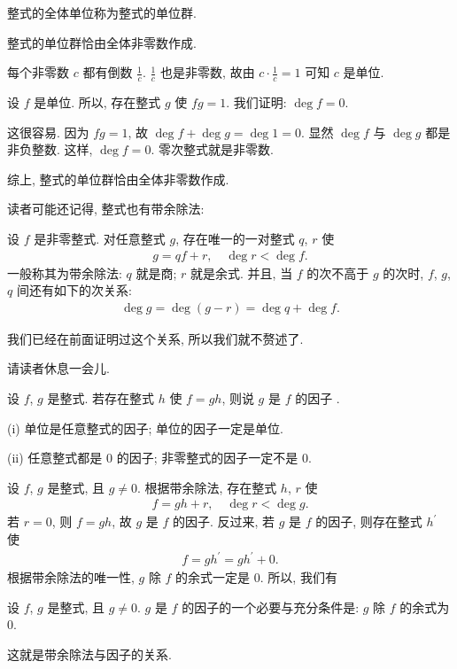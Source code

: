 \begin{definition}
    整式的全体单位称为整式的单位群.
\end{definition}

\begin{proposition}
    整式的单位群恰由全体非零数作成.
\end{proposition}

\begin{pf}
    每个非零数 $c$ 都有倒数 $\frac{1}{c}$. $\frac{1}{c}$ 也是非零数, 故由 $c \cdot \frac{1}{c} = 1$ 可知 $c$ 是单位.

    设 $f$ 是单位. 所以, 存在整式 $g$ 使 $fg = 1$. 我们证明: $\deg f = 0$.

    这很容易. 因为 $fg = 1$, 故 $\deg f + \deg g = \deg 1 = 0$. 显然 $\deg f$ 与 $\deg g$ 都是非负整数. 这样, $\deg f = 0$. 零次整式就是非零数.

    综上, 整式的单位群恰由全体非零数作成.
\end{pf}

读者可能还记得, 整式也有带余除法:

\begin{proposition}
    设 $f$ 是非零整式. 对任意整式 $g$, 存在唯一的一对整式 $q$, $r$ 使
    \begin{align*}
        g = q f + r, \quad \deg r < \deg f.
    \end{align*}
    一般称其为带余除法: $q$ 就是商; $r$ 就是余式. 并且, 当 $f$ 的次不高于 $g$ 的次时, $f$, $g$, $q$ 间还有如下的次关系:
    \begin{align*}
        \deg g = \deg (g - r) = \deg q + \deg f.
    \end{align*}
\end{proposition}

我们已经在前面证明过这个关系, 所以我们就不赘述了.

请读者休息一会儿.

\myLine

\begin{definition}
    设 $f$, $g$ 是整式. 若存在整式 $h$ 使 $f=gh$, 则说 $g$ 是 $f$ 的因子 .
\end{definition}

\begin{example}
    (i) 单位是任意整式的因子; 单位的因子一定是单位.

    (ii) 任意整式都是 $0$ 的因子; 非零整式的因子一定不是 $0$.
\end{example}

设 $f$, $g$ 是整式, 且 $g \neq 0$. 根据带余除法, 存在整式 $h$, $r$ 使
\begin{align*}
    f = gh + r, \quad \deg r < \deg g.
\end{align*}
若 $r = 0$, 则 $f = gh$, 故 $g$ 是 $f$ 的因子. 反过来, 若 $g$ 是 $f$ 的因子, 则存在整式 $h^{\prime}$ 使
\begin{align*}
    f = gh^{\prime} = gh^{\prime} + 0.
\end{align*}
根据带余除法的唯一性, $g$ 除 $f$ 的余式一定是 $0$. 所以, 我们有
\begin{proposition}
    设 $f$, $g$ 是整式, 且 $g \neq 0$. $g$ 是 $f$ 的因子的一个必要与充分条件是: $g$ 除 $f$ 的余式为 $0$.
\end{proposition}
这就是带余除法与因子的关系.


